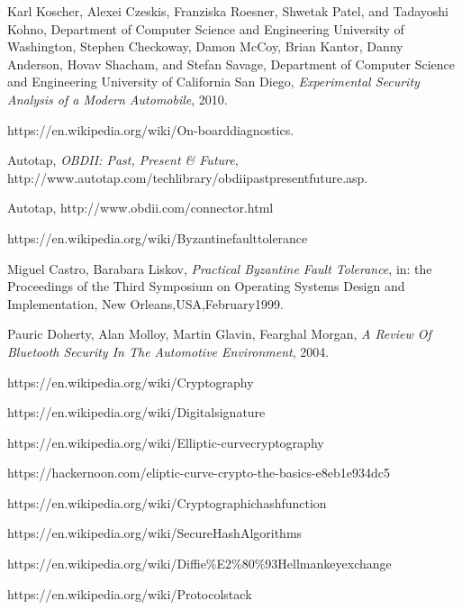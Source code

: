 \documentclass[11pt]{article}
\begin{document}
\begin{thebibliography}{10}
	Karl Koscher, Alexei Czeskis, Franziska Roesner, Shwetak Patel, and Tadayoshi Kohno,
	Department of Computer Science and Engineering University of Washington, Stephen Checkoway, Damon McCoy, Brian Kantor, Danny Anderson, Hovav Shacham, and Stefan Savage, Department of Computer Science and Engineering University of California San Diego, \textit{Experimental Security Analysis of a Modern Automobile}, 2010.
	
	https://en.wikipedia.org/wiki/On-board\textunderscore diagnostics.
	
	Autotap, \textit{OBDII: Past, Present \& Future},
	http://www.autotap.com/techlibrary/obdii\textunderscore past\textunderscore present\textunderscore future.asp.
	
	Autotap, http://www.obdii.com/connector.html
	
	https://en.wikipedia.org/wiki/Byzantine\textunderscore fault\textunderscore tolerance
	
	Miguel Castro, Barabara Liskov, \textit{Practical Byzantine Fault Tolerance}, in: the Proceedings of the Third Symposium on Operating Systems Design and Implementation, New Orleans,USA,February1999.
	
	Pauric Doherty, Alan Molloy, Martin Glavin, Fearghal Morgan,
	\textit{A Review Of Bluetooth Security In The Automotive Environment}, 2004.
	
	https://en.wikipedia.org/wiki/Cryptography
	
	https://en.wikipedia.org/wiki/Digital\textunderscore signature
	
	https://en.wikipedia.org/wiki/Elliptic-curve\textunderscore cryptography
	
	https://hackernoon.com/eliptic-curve-crypto-the-basics-e8eb1e934dc5
	
	https://en.wikipedia.org/wiki/Cryptographic\textunderscore hash\textunderscore function
	
	https://en.wikipedia.org/wiki/Secure\textunderscore Hash\textunderscore Algorithms
	
	https://en.wikipedia.org/wiki/Diffie\%E2\%80\%93Hellman\textunderscore key\textunderscore exchange
	
	https://en.wikipedia.org/wiki/Protocol\textunderscore stack
	

\end{thebibliography}
\end{document}
